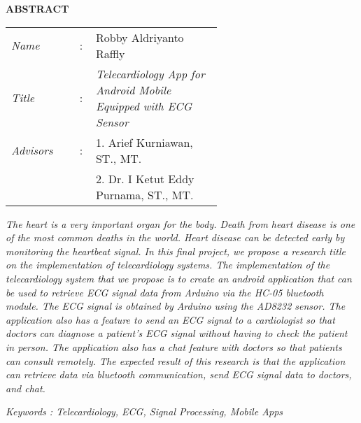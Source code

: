 \begin{center}
\Large\textbf{ABSTRACT}
\end{center}
\vspace{1ex}

\begin{adjustwidth}{-0.2cm}{}
\begin{tabular}{lcp{0.6\linewidth}}
\textit{Name} &:& Robby Aldriyanto Raffly\\
\textit{Title} &:& \textit{Telecardiology App for Android Mobile Equipped with ECG Sensor} \\
\textit{Advisors} &:& 1. Arief Kurniawan, ST., MT. \\
& & 2. Dr. I Ketut Eddy Purnama, ST., MT. \\
\end{tabular}
\end{adjustwidth}
\vspace{1ex}

	\setlength{\parindent}{0cm}
	\textit{The heart is a very important organ for the body. Death from heart disease is one of the most common deaths in the world. Heart disease can be detected early by monitoring the heartbeat signal. In this final project, we propose a research title on the implementation of telecardiology systems. The implementation of the telecardiology system that we propose is to create an android application that can be used to retrieve ECG signal data from Arduino via the HC-05 bluetooth module. The ECG signal is obtained by Arduino using the AD8232 sensor. The application also has a feature to send an ECG signal to a cardiologist so that doctors can diagnose a patient's ECG signal without having to check the patient in person. The application also has a chat feature with doctors so that patients can consult remotely. The expected result of this research is that the application can retrieve data via bluetooth communication, send ECG signal data to doctors, and chat.} 
	\vspace{2ex}
	
	\textit{Keywords : Telecardiology, ECG, Signal Processing, Mobile Apps}
	\newpage
